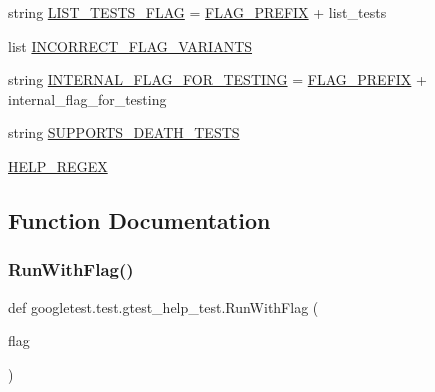 \begin{DoxyCompactItemize}
\item 
string \mbox{\hyperlink{namespacegoogletest_1_1test_1_1gtest__help__test_ae2dc57dd4dac280d307902e690832e7b}{L\+I\+S\+T\+\_\+\+T\+E\+S\+T\+S\+\_\+\+F\+L\+AG}} = \mbox{\hyperlink{namespacegoogletest_1_1test_1_1gtest__help__test_abcdf68c576877303d231c0f463920b0b}{F\+L\+A\+G\+\_\+\+P\+R\+E\+F\+IX}} + \textquotesingle{}list\+\_\+tests\textquotesingle{}
\item 
list \mbox{\hyperlink{namespacegoogletest_1_1test_1_1gtest__help__test_ac07fe8f8ad8fa6a5ddaa09726c19d6fe}{I\+N\+C\+O\+R\+R\+E\+C\+T\+\_\+\+F\+L\+A\+G\+\_\+\+V\+A\+R\+I\+A\+N\+TS}}
\item 
string \mbox{\hyperlink{namespacegoogletest_1_1test_1_1gtest__help__test_a49459de300134ea14cdcd284388ff006}{I\+N\+T\+E\+R\+N\+A\+L\+\_\+\+F\+L\+A\+G\+\_\+\+F\+O\+R\+\_\+\+T\+E\+S\+T\+I\+NG}} = \mbox{\hyperlink{namespacegoogletest_1_1test_1_1gtest__help__test_abcdf68c576877303d231c0f463920b0b}{F\+L\+A\+G\+\_\+\+P\+R\+E\+F\+IX}} + \textquotesingle{}internal\+\_\+flag\+\_\+for\+\_\+testing\textquotesingle{}
\item 
string \mbox{\hyperlink{namespacegoogletest_1_1test_1_1gtest__help__test_aa00db51f0e5d3311467f62945df8e2c7}{S\+U\+P\+P\+O\+R\+T\+S\+\_\+\+D\+E\+A\+T\+H\+\_\+\+T\+E\+S\+TS}}
\item 
\mbox{\hyperlink{namespacegoogletest_1_1test_1_1gtest__help__test_a41a115d419dbaac83851205b41edb00e}{H\+E\+L\+P\+\_\+\+R\+E\+G\+EX}}
\end{DoxyCompactItemize}


\subsection{Function Documentation}
\mbox{\label{namespacegoogletest_1_1test_1_1gtest__help__test_a8a458d794d12c66871ed04be8a587b9e}} 
\subsubsection{\texorpdfstring{RunWithFlag()}{RunWithFlag()}}
{\footnotesize\ttfamily def googletest.\+test.\+gtest\+\_\+help\+\_\+test.\+Run\+With\+Flag (\begin{DoxyParamCaption}\item[{}]{flag }\end{DoxyParamCaption})}

